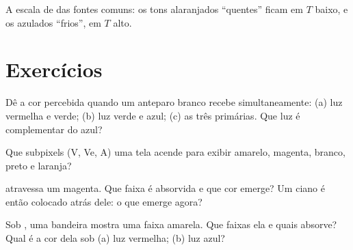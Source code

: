 \begin{omfigure}

{\small A escala de  das fontes comuns: os tons
alaranjados ``quentes'' ficam em $T$ baixo, e os azulados ``frios'', em
$T$ alto.}
\end{omfigure}

\section{Exercícios}

\begin{exercise}[$\star$]\label{exo:g11:color-light-sources:1}
Dê a cor percebida quando um anteparo branco recebe simultaneamente:
(a) luz vermelha e verde; (b) luz verde e azul; (c) as três primárias.
Que luz é complementar do azul?
\end{exercise}

\begin{exercise}[$\star$]\label{exo:g11:color-light-sources:2}
Que subpixels (V, Ve, A) uma tela acende para exibir amarelo, magenta,
branco, preto e laranja?
\end{exercise}

\begin{exercise}[$\star$]\label{exo:g11:color-light-sources:3}
 atravessa um  magenta. Que faixa é absorvida e que cor
emerge? Um  ciano é então colocado atrás dele: o que emerge agora?
\end{exercise}

\begin{exercise}[$\star$]\label{exo:g11:color-light-sources:4}
Sob , uma bandeira mostra uma faixa amarela. Que faixas ela
 e quais absorve? Qual é a cor dela sob (a) luz vermelha; (b) luz
azul?
\end{exercise}

